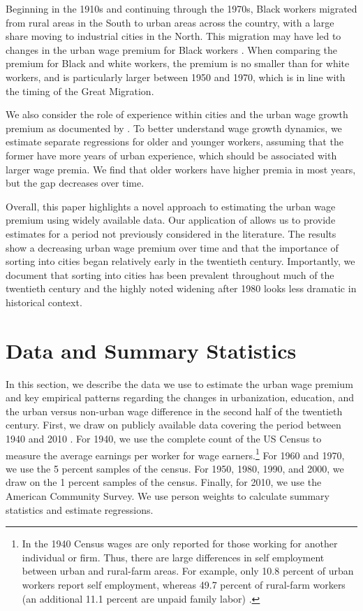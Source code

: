 \documentclass[12pt]{article}
\begin{document}
Beginning in the 1910s and continuing through the 1970s, Black workers migrated from rural areas in the South to urban areas across the country, with a large share moving to industrial cities in the North. 
This migration may have led to changes in the urban wage premium for Black workers \citep{boustan2009competition, collins2021great, derenoncourt2022can}. 
When comparing the premium for Black and white workers, the premium is no smaller than for white workers, and is particularly larger between 1950 and 1970, which is in line with the timing of the Great Migration.

We also consider the role of experience within cities and the urban wage growth premium as documented by \citet{BaumSnow_Pavan_2012}. 
To better understand wage growth dynamics, we estimate separate regressions for older and younger workers, assuming that the former have more years of urban experience, which should be associated with larger wage premia.
We find that older workers have higher premia in most years, but the gap decreases over time.

Overall, this paper highlights a novel approach to estimating the urban wage premium using widely available data. 
Our application of \cite{altonji2018estimating} allows us to provide estimates for a period not previously considered in the literature.
The results show a decreasing urban wage premium over time and that the importance of sorting into cities began relatively early in the twentieth century.
Importantly, we document that sorting into cities has been prevalent throughout much of the twentieth century and the highly noted widening after 1980 looks less dramatic in historical context.  

\section{Data and Summary Statistics}\label{sec:data}

In this section, we describe the data we use to estimate the urban wage premium and key empirical patterns regarding the changes in urbanization, education, and the urban versus non-urban wage difference in the second half of the twentieth century.
First, we draw on publicly available data covering the period between 1940 and 2010 \citep*{ruggles2022full, ruggles2022census}.
For 1940, we use the complete count of the US Census to measure the average earnings per worker for wage earners.\footnote{In the 1940 Census wages are only reported for those working for another individual or firm. Thus, there are large differences in self employment between urban and rural-farm areas. For example, only 10.8 percent of urban workers report self employment, whereas 49.7 percent of rural-farm workers (an additional 11.1 percent are unpaid family labor) \citep{census1940pop}.}
For 1960 and 1970, we use the 5 percent samples of the census.
For 1950, 1980, 1990, and 2000, we draw on the 1 percent samples of the census.
Finally, for 2010, we use the American Community Survey.
We use person weights to calculate summary statistics and estimate regressions. 
\end{document}
